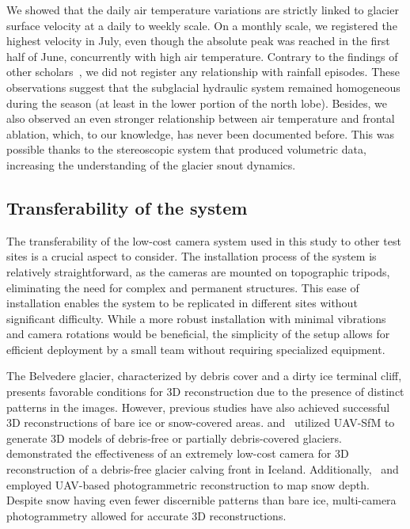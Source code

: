 We showed that the daily air temperature variations are strictly linked to glacier surface velocity at a daily to weekly scale.
On a monthly scale, we registered the highest velocity in July, even though the absolute peak was reached in the first half of June, concurrently with high air temperature.
Contrary to the findings of other scholars~\citep{benoit2015multi,horgan2015glacier,sugiyama2010surface}, we did not register any relationship with rainfall episodes.
These observations suggest that the subglacial hydraulic system remained homogeneous during the season (at least in the lower portion of the north lobe).
Besides, we also observed an even stronger relationship between air temperature and frontal ablation, which, to our knowledge, has never been documented before.
This was possible thanks to the stereoscopic system that produced volumetric data, increasing the understanding of the glacier snout dynamics.

\subsection{Transferability of the system}\label{sec:4:transferability}

The transferability of the low-cost camera system used in this study to other test sites is a crucial aspect to consider.
The installation process of the system is relatively straightforward, as the cameras are mounted on topographic tripods, eliminating the need for complex and permanent
structures.
This ease of installation enables the system to be replicated in different sites without significant difficulty.
While a more robust installation with minimal vibrations and camera rotations would be beneficial, the simplicity of the setup allows for efficient deployment by a small team without requiring specialized equipment.

The Belvedere glacier, characterized by debris cover and a dirty ice terminal cliff, presents favorable conditions for 3D reconstruction due to the presence of distinct
patterns in the images. 
However, previous studies have also achieved successful 3D reconstructions of bare ice or snow-covered areas.
\citet{belloni2023} and~\citet{Gindraux2017} utilized UAV-SfM to generate 3D models of debris-free or partially debris-covered glaciers.
\citet{Taylor2023} demonstrated the effectiveness of an extremely low-cost camera for 3D reconstruction of a debris-free glacier calving front in Iceland.
Additionally,~\citet{Avanzi2018} and~\citet{DeMichele2016} employed UAV-based photogrammetric reconstruction to map snow depth.
Despite snow having even fewer discernible patterns than bare ice, multi-camera photogrammetry allowed for accurate 3D reconstructions.

